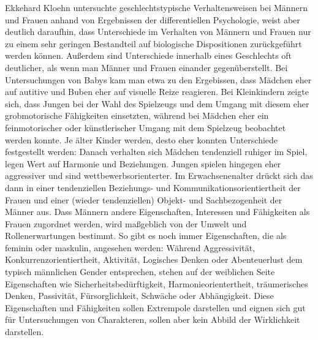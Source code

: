 Ekkehard Kloehn untersuchte geschlechtstypische Verhaltensweisen bei Männern und Frauen anhand von Ergebnissen der differentiellen Psychologie, weist aber deutlich daraufhin, dass Unterschiede im Verhalten von Männern und Frauen nur zu einem sehr geringen Bestandteil auf biologische Dispositionen zurückgeführt werden können. Außerdem sind Unterschiede innerhalb eines Geschlechts oft deutlicher, als wenn man Männer und Frauen einander gegenüberstellt. \parencite[53]{Kloehn1978}
Bei Untersuchungen von Babys kam man etwa zu den Ergebissen, dass Mädchen eher auf autitive und Buben eher auf visuelle Reize reagieren. Bei Kleinkindern zeigte sich, dass Jungen bei der Wahl des Spielzeugs und dem Umgang mit diesem eher grobmotorische Fähigkeiten einsetzten, während bei Mädchen eher ein feinmotorischer oder künstlerischer Umgang mit dem Spielzeug beobachtet werden konnte. Je älter Kinder werden, desto eher konnten Unterschiede festgestellt werden: Danach verhalten sich Mädchen tendenziell ruhiger im Spiel, legen Wert auf Harmonie und Beziehungen. Jungen spielen hingegen eher aggressiver und sind wettbewerbsorienterter. Im Erwachsenenalter drückt sich das dann in einer tendenziellen Beziehungs- und Kommunikationsorientiertheit der Frauen und einer (wieder tendenziellen) Objekt- und Sachbezogenheit der Männer aus. \parencite[74]{Kloehn1978} Dass Männern andere Eigenschaften, Interessen und Fähigkeiten als Frauen zugordnet werden, wird maßgeblich von der Umwelt und Rollenerwartungen bestimmt. So gibt es noch immer Eigenschaften, die als feminin oder maskulin, angesehen werden: Während Aggressivität, Konkurrenzorientiertheit, Aktivität, Logisches Denken oder Abenteuerlust dem typisch männlichen Gender entsprechen, stehen auf der weiblichen Seite Eigenschaften wie Sicherheitsbedürftigkeit, Harmonieorientertheit, träumerisches Denken, Passivität, Fürsorglichkeit, Schwäche oder Abhängigkeit. \parencite[175]{Feldmann2006} Diese Eigenschaften und Fähigkeiten sollen Extrempole darstellen und eignen sich gut für Untersuchungen von Charakteren, sollen aber kein Abbild der Wirklichkeit darstellen.

